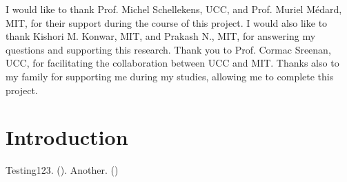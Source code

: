 \documentclass[12pt]{report}
\newcommand{\citebu}[1]{\citeauthor{#1} (\citeyear{#1})}
\theoremstyle{definition}
\begin{document}
    \vspace{1cm}

    I would like to thank Prof. Michel Schellekens, UCC, and Prof. Muriel M\'{e}dard, MIT, for their support during the course of this project. I would also like to thank Kishori M. Konwar, MIT, and Prakash N., MIT, for answering my questions and supporting this research. Thank you to Prof. Cormac Sreenan, UCC, for facilitating the collaboration between UCC and MIT. Thanks also to my family for supporting me during my studies, allowing me to complete this project.

  \tableofcontents

  \chapter{Introduction}
    Testing123. \citebu{attiya1995sharing}. Another. \citebu{beyer2016site}

  
  
  
\end{document}
